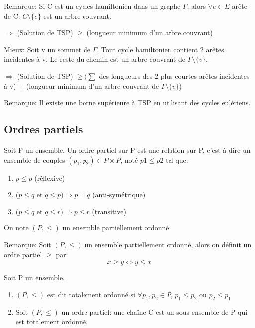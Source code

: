\begin{exmp}

\end{exmp}


Remarque: Si C est un cycles hamiltonien dans un graphe $\Gamma$, alors $\forall e \in E$ arête de C: $ C \setminus\{e\}$ est un arbre couvrant.

$\Rightarrow$ (Solution de TSP) $\geq$ (longueur minimum d'un arbre couvrant)

Mieux: Soit v un sommet de $\Gamma$. Tout cycle hamiltonien contient 2 arêtes incidentes à v. Le reste du chemin est un arbre couvrant de $\Gamma \setminus\{v\}$.

$\Rightarrow$ (Solution de TSP) $\geq (\sum$ des longueurs des 2 plus courtes arêtes incidentes à v) + (longueur minimum d'un arbre couvrant de $\Gamma \setminus\{v\}$)

Remarque: Il existe une borne supérieure à TSP en utilisant des cycles eulériens. 


\newpage

\subsection{Ordres partiels}

\begin{defn}
Soit P un ensemble. Un ordre partiel sur P est une relation sur P, c'est à dire un ensemble de couples $(p_{1},p_{2}) \in P\times P$, noté $p{1} \leq p{2}$ tel que:
	\begin{enumerate}
		\item $p \leq p$ (réflexive)
		\item $(p \leq q$ et $q \leq p ) \Rightarrow p = q$ (anti-symétrique)
		\item $(p \leq q$ et $q \leq r ) \Rightarrow p \leq r$ (transitive)
	\end{enumerate}
On note $(P,\leq)$ un ensemble partiellement ordonné.
\end{defn}

Remarque: Soit $(P,\leq)$ un ensemble partiellement ordonné, alors on définit un ordre partiel $\geq$ par: $$x \geq y \Leftrightarrow y \leq x$$

\begin{defn}
Soit P un ensemble.
	\begin{enumerate}
		\item $(P,\leq)$ est dit totalement ordonné si $\forall p_{1},p_{2} \in P$, $p_{1} \leq p_{2}$ ou $p_{2} \leq p_{1}$
		\item Soit $(P,\leq)$ un ordre partiel: une chaîne C est un sous-ensemble de P qui est totalement ordonné.
	\end{enumerate}
\end{defn}

